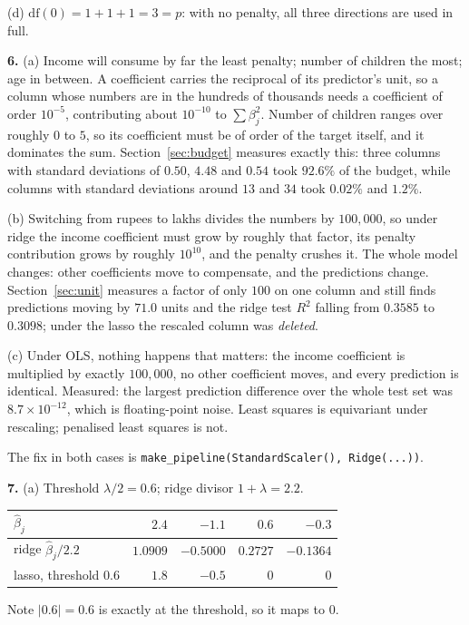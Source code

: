 \documentclass[11pt]{article}
\newcommand{\bhat}{\hat\beta}
\begin{document}
(d) $\mathrm{df}(0) = 1 + 1 + 1 = 3 = p$: with no penalty, all three
directions are used in full.

\medskip
\textbf{6.} (a) Income will consume by far the least penalty; number of
children the most; age in between. A coefficient carries the reciprocal of its
predictor's unit, so a column whose numbers are in the hundreds of thousands
needs a coefficient of order $10^{-5}$, contributing about $10^{-10}$ to
$\sum\beta_j^2$. Number of children ranges over roughly $0$ to $5$, so its
coefficient must be of order of the target itself, and it dominates the sum.
Section~\ref{sec:budget} measures exactly this: three columns with standard
deviations of $0.50$, $4.48$ and $0.54$ took $92.6\%$ of the budget, while
columns with standard deviations around $13$ and $34$ took $0.02\%$ and
$1.2\%$.

(b) Switching from rupees to lakhs divides the numbers by $100{,}000$, so
under ridge the income coefficient must grow by roughly that factor, its
penalty contribution grows by roughly $10^{10}$, and the penalty crushes it.
The whole model changes: other coefficients move to compensate, and the
predictions change. Section~\ref{sec:unit} measures a factor of only $100$ on
one column and still finds predictions moving by $71.0$ units and the ridge
test $R^2$ falling from $0.3585$ to $0.3098$; under the lasso the rescaled
column was \emph{deleted}.

(c) Under OLS, nothing happens that matters: the income coefficient is
multiplied by exactly $100{,}000$, no other coefficient moves, and every
prediction is identical. Measured: the largest prediction difference over the
whole test set was $8.7\times10^{-12}$, which is floating-point noise. Least
squares is equivariant under rescaling; penalised least squares is not.

The fix in both cases is \texttt{make\_pipeline(StandardScaler(),
Ridge(...))}.

\medskip
\textbf{7.} (a) Threshold $\lambda/2 = 0.6$; ridge divisor
$1 + \lambda = 2.2$.
\begin{center}
\begin{tabular}{@{}lrrrr@{}}
\toprule
$\bhat_j$ & $2.4$ & $-1.1$ & $0.6$ & $-0.3$\\
\midrule
ridge $\bhat_j/2.2$ & $1.0909$ & $-0.5000$ & $0.2727$ & $-0.1364$\\
lasso, threshold $0.6$ & $1.8$ & $-0.5$ & $0$ & $0$\\
\bottomrule
\end{tabular}
\end{center}
Note $|0.6| = 0.6$ is exactly at the threshold, so it maps to $0$.
\end{document}
